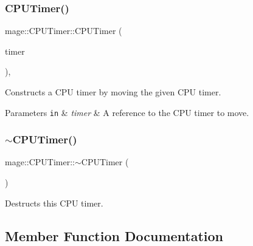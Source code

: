 \subsubsection{\texorpdfstring{C\+P\+U\+Timer()}{CPUTimer()}\hspace{0.1cm}{\footnotesize\ttfamily [3/3]}}
{\footnotesize\ttfamily mage\+::\+C\+P\+U\+Timer\+::\+C\+P\+U\+Timer (\begin{DoxyParamCaption}\item[{\hyperlink{classmage_1_1_c_p_u_timer}{C\+P\+U\+Timer} \&\&}]{timer }\end{DoxyParamCaption})\hspace{0.3cm}{\ttfamily [default]}, {\ttfamily [noexcept]}}

Constructs a C\+PU timer by moving the given C\+PU timer.


\begin{DoxyParams}[1]{Parameters}
\mbox{\tt in}  & {\em timer} & A reference to the C\+PU timer to move. \\
\hline
\end{DoxyParams}
\hypertarget{classmage_1_1_c_p_u_timer_a32583449026cf0589104767339486d4b}{}\label{classmage_1_1_c_p_u_timer_a32583449026cf0589104767339486d4b} 
\subsubsection{\texorpdfstring{$\sim$\+C\+P\+U\+Timer()}{~CPUTimer()}}
{\footnotesize\ttfamily mage\+::\+C\+P\+U\+Timer\+::$\sim$\+C\+P\+U\+Timer (\begin{DoxyParamCaption}{ }\end{DoxyParamCaption})\hspace{0.3cm}{\ttfamily [default]}}

Destructs this C\+PU timer. 

\subsection{Member Function Documentation}
\hypertarget{classmage_1_1_c_p_u_timer_a5d033c20772755d6a6693e1b495cf589}{}\label{classmage_1_1_c_p_u_timer_a5d033c20772755d6a6693e1b495cf589} 

